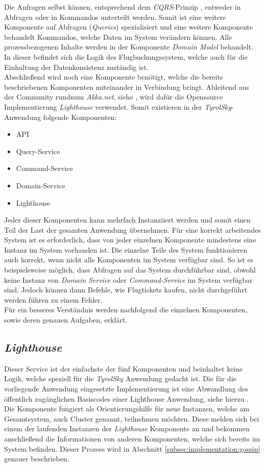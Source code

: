 Die Anfragen selbst können, entsprechend dem \textit{CQRS}-Prinzip \cite{cqrsYoung2010}, entweder in Abfragen oder in Kommandos unterteilt werden. Somit ist eine weitere Komponente auf Abfragen (\textit{Queries}) spezialisiert und eine weitere Komponente behandelt Kommandos, welche Daten im System verändern können. Alle prozessbezogenen Inhalte werden in der Komponente \textit{Domain Model} behandelt. In dieser befindet sich die Logik des Flugbuchungssystem, welche auch für die Einhaltung der Datenkonsistenz zuständig ist. \\
Abschließend wird noch eine Komponente benötigt, welche die bereits beschriebenen Komponenten miteinander in Verbindung bringt. 
Ableitend aus der Community rundnum \textit{Akka.net}, siehe \cite{lighthouse}, wird dafür die Opensource Implementierung \textit{Lighthouse} verwendet. Somit existieren in der \textit{TyrolSky}-Anwendung folgende Komponenten:
\begin{itemize}
    \item API
    \item Query-Service
    \item Command-Service
    \item Domain-Service
    \item Lighthouse
\end{itemize}
Jeder dieser Komponenten kann mehrfach Instanziiert werden und somit einen Teil der Last der gesamten Anwendung übernehmen. Für eine korrekt arbeitendes System ist es erforderlich, dass von jeder einzelnen Komponente mindestens eine Instanz im System vorhanden ist. Die einzelne Teile des System funktionieren auch korrekt, wenn nicht alle Komponenten im System verfügbar sind. So ist es beispielsweise möglich, dass Abfragen auf das System durchführbar sind, obwohl keine Instanz von \textit{Domain Service} oder \textit{Command-Service} im System verfügbar sind. Jedoch können dann Befehle, wie Flugtickets kaufen, nicht durchgeführt werden führen zu einem Fehler.\\
Für ein besseres Verständnis werden nachfolgend die einzelnen Komponenten, sowie deren genauen Aufgaben, erklärt.

\subsection{\textit{Lighthouse}}
\label{subsec:implementation:lighthouse}
Dieser Service ist der einfachste der fünf Komponenten und beinhaltet keine Logik, welche speziell für die \textit{TyrolSky} Anwendung gedacht ist. Die für die vorliegende Anwendung eingesetzte Implementierung ist eine Abwandlung des öffentlich zugänglichen Basiscodes einer Lighthouse Anwendung, siehe hierzu \cite{lighthouse}. \\
Die Komponente fungiert als Orientierungshilfe für neue Instanzen, welche am Gesamtsystem, auch Cluster genannt, teilnehmen möchten. Diese melden sich bei einem der laufenden Instanzen der \textit{Lighthouse} Komponente an und bekommen anschließend die Informationen von anderen Komponenten, welche sich bereits im System befinden. Dieser Prozess wird in Abschnitt \ref{subsec:implementation:gossip} genauer beschrieben.

